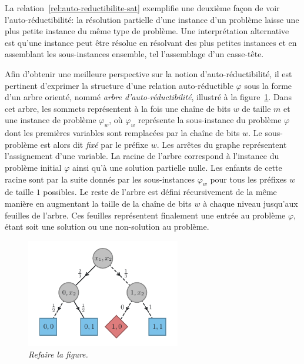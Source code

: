 La relation~\ref{rel:auto-reductibilite-sat} exemplifie une deuxième façon de voir l'auto-réductibilité: la résolution partielle d'une instance d'un problème laisse une plus petite instance du même type de problème. Une interprétation alternative est qu'une instance peut être résolue en résolvant des plus petites instances et en assemblant les sous-instances ensemble, tel l'assemblage d'un casse-tête. 

Afin d'obtenir une meilleure perspective sur la notion d'auto-réductibilité, il est pertinent d'exprimer la structure d'une relation auto-réductible $\varphi$ sous la forme d'un arbre orienté, nommé \textit{arbre d'auto-réductibilité}, illustré à la figure~\ref{fig:arbre-auto-reductibilite}. Dans cet arbre, les sommets représentent à la fois une chaîne de bits $w$ de taille $m$ et une instance de problème $\varphi_{w}$, où $\varphi_{w}$ représente la sous-instance du problème $\varphi$ dont les premières variables sont remplacées par la chaîne de bits $w$. Le sous-problème est alors dit \textit{fixé} par le préfixe $w$. Les arrêtes du graphe représentent l'assignement d'une variable. La racine de l'arbre correspond à l'instance du problème initial $\varphi$ ainsi qu'à une solution partielle nulle. Les enfants de cette racine sont par la suite donnés par les sous-instances $\varphi_{w}$ pour tous les préfixes $w$ de taille $1$ possibles. Le reste de l'arbre est défini récursivement de la même manière en augmentant la taille de la chaîne de bits $w$ à chaque niveau jusqu'aux feuilles de l'arbre. Ces feuilles représentent finalement une entrée au problème $\varphi$, étant soit une solution ou une non-solution au problème.

\begin{figure}[ht!]
    \centering
    \includegraphics[width=0.6\textwidth]{figures/jvv-algorithm.pdf}
    \caption[Arbre d'auto-réductibilité]{\textcolor{mydarkred}{\textit{Refaire la figure.}}}
    \label{fig:arbre-auto-reductibilite}
\end{figure}

